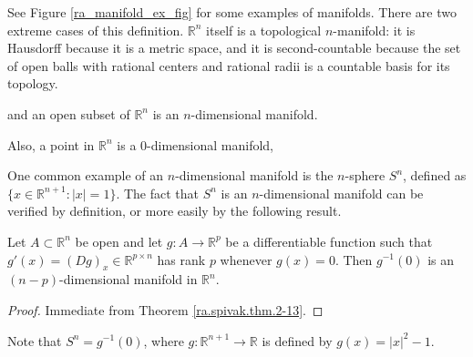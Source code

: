 \begin{example}


See Figure \ref{ra_manifold_ex_fig} for some examples of manifolds. There are two extreme cases of this definition. \(\mathbb{R}^n\) itself is a topological \(n\)-manifold: it is Hausdorff because it is a metric space, and it is second-countable because the set of open balls with rational centers and rational radii is a countable basis for its topology.


 and an open subset of \(\mathbb{R}^n\) is an \(n\)-dimensional manifold.

Also,  a point in \(\mathbb{R}^n\) is a 0-dimensional manifold,

\end{example}

One common example of an \(n\)-dimensional manifold is the \(n\)-sphere \(S^n\), defined as \(\{x \in \mathbb{R}^{n+1}: |x| = 1\}\). The fact that \(S^n\) is an \(n\)-dimensional manifold can be verified by definition, or more easily by the following result.

\begin{theorem}\label{ra.spivak.thm.5-1}

Let \(A \subset \mathbb{R}^n\) be open and let \(g: A \to \mathbb{R}^p\) be a differentiable function such that \(g'(x) = (Dg)_{x} \in \mathbb{R}^{p \times n}\) has rank \(p\) whenever \(g(x) = 0\). Then \(g^{-1}(0)\) is an \((n-p)\)-dimensional manifold in \(\mathbb{R}^n\).

\end{theorem}

\begin{proof}

Immediate from Theorem \ref{ra.spivak.thm.2-13}.

\end{proof}


Note that \(S^n = g^{-1}(0)\), where \(g: \mathbb{R}^{n+1} \to \mathbb{R}\) is defined by \(g(x) = |x|^2 -1\).




